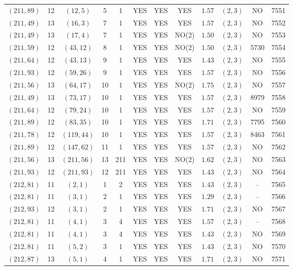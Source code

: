 \begin{longtable}{|c|c|c|c|c|c|c|c|c|c|c|c|}
$(211,89)$ & 12 & $(12,5)$ & 5 & 1 & YES & YES & YES & $1.57$ & $(2,3)$ & NO & 7551\\
$(211,49)$ & 13 & $(16,3)$ & 7 & 1 & YES & YES & YES & $1.57$ & $(2,3)$ & NO & 7552\\
$(211,49)$ & 13 & $(17,4)$ & 7 & 1 & YES & YES & NO(2) & $1.50$ & $(2,3)$ & NO & 7553\\
$(211,59)$ & 12 & $(43,12)$ & 8 & 1 & YES & YES & NO(2) & $1.50$ & $(2,3)$ & 5730 & 7554\\
$(211,64)$ & 12 & $(43,13)$ & 9 & 1 & YES & YES & YES & $1.43$ & $(2,3)$ & NO & 7555\\
$(211,93)$ & 12 & $(59,26)$ & 9 & 1 & YES & YES & YES & $1.57$ & $(2,3)$ & NO & 7556\\
$(211,56)$ & 13 & $(64,17)$ & 10 & 1 & YES & YES & NO(2) & $1.75$ & $(2,3)$ & NO & 7557\\
$(211,49)$ & 13 & $(73,17)$ & 10 & 1 & YES & YES & YES & $1.57$ & $(2,3)$ & 8979 & 7558\\
$(211,64)$ & 12 & $(79,24)$ & 10 & 1 & YES & YES & YES & $1.57$ & $(2,3)$ & NO & 7559\\
$(211,89)$ & 12 & $(83,35)$ & 10 & 1 & YES & YES & YES & $1.71$ & $(2,3)$ & 7795 & 7560\\
$(211,78)$ & 12 & $(119,44)$ & 10 & 1 & YES & YES & YES & $1.57$ & $(2,3)$ & 8463 & 7561\\
$(211,89)$ & 12 & $(147,62)$ & 11 & 1 & YES & YES & YES & $1.57$ & $(2,3)$ & NO & 7562\\
$(211,56)$ & 13 & $(211,56)$ & 13 & 211 & YES & YES & NO(2) & $1.62$ & $(2,3)$ & NO & 7563\\
$(211,93)$ & 12 & $(211,93)$ & 12 & 211 & YES & YES & YES & $1.43$ & $(2,3)$ & NO & 7564\\
$(212,81)$ & 11 & $(2,1)$ & 1 & 2 & YES & YES & YES & $1.43$ & $(2,3)$ & -- & 7565\\
$(212,81)$ & 11 & $(3,1)$ & 2 & 1 & YES & YES & YES & $1.29$ & $(2,3)$ & -- & 7566\\
$(212,93)$ & 12 & $(3,1)$ & 2 & 1 & YES & YES & YES & $1.71$ & $(2,3)$ & NO & 7567\\
$(212,81)$ & 11 & $(4,1)$ & 3 & 4 & YES & YES & YES & $1.57$ & $(2,3)$ & -- & 7568\\
$(212,81)$ & 11 & $(4,1)$ & 3 & 4 & YES & YES & YES & $1.43$ & $(2,3)$ & NO & 7569\\
$(212,81)$ & 11 & $(5,2)$ & 3 & 1 & YES & YES & YES & $1.43$ & $(2,3)$ & NO & 7570\\
$(212,87)$ & 13 & $(5,1)$ & 4 & 1 & YES & YES & YES & $1.71$ & $(2,3)$ & NO & 7571\\

\end{longtable}
